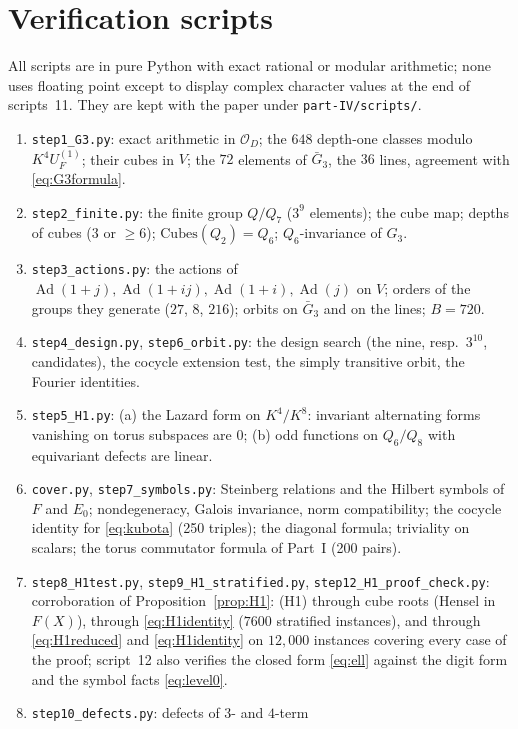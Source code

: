 \documentclass[11pt]{article}
\newcommand{\Ad}{\operatorname{Ad}}
\newcommand{\Ocal}{\mathcal O}
\newcommand{\Cubes}{\mathrm{Cubes}}
\theoremstyle{plain}
\theoremstyle{definition}
\begin{document}
\section{Verification scripts}\label{app:scripts}
All scripts are in pure Python with exact rational or modular
arithmetic; none uses floating point except to display complex
character values at the end of scripts~11.  They are kept with the
paper under \texttt{part-IV/scripts/}.
\begin{enumerate}[label=\arabic*.]
\item \texttt{step1\_G3.py}: exact arithmetic in $\Ocal_D$; the $648$
depth-one classes modulo $K^4U_F^{(1)}$; their cubes in $V$; the $72$
elements of $\bar G_3$, the $36$ lines, agreement with \eqref{eq:G3formula}.
\item \texttt{step2\_finite.py}: the finite group $Q/Q_7$ ($3^9$
elements); the cube map; depths of cubes ($3$ or $\ge6$);
$\Cubes(Q_2)=Q_6$; $Q_6$-invariance of $G_3$.
\item \texttt{step3\_actions.py}: the actions of $\Ad(1+j),\Ad(1+ij),\Ad(1+i),\Ad(j)$
on $V$; orders of the groups they generate ($27$, $8$, $216$); orbits on
$\bar G_3$ and on the lines; $B=720$.
\item \texttt{step4\_design.py}, \texttt{step6\_orbit.py}: the design
search (the nine, resp.\ $3^{10}$, candidates), the cocycle extension
test, the simply transitive orbit, the Fourier identities.
\item \texttt{step5\_H1.py}: (a) the Lazard form on $K^4/K^8$:
invariant alternating forms vanishing on torus subspaces are $0$;
(b) odd functions on $Q_6/Q_8$ with equivariant defects are linear.
\item \texttt{cover.py}, \texttt{step7\_symbols.py}: Steinberg
relations and the Hilbert symbols of $F$ and $E_0$; nondegeneracy,
Galois invariance, norm compatibility; the cocycle identity for
\eqref{eq:kubota} (250 triples); the diagonal formula; triviality on
scalars; the torus commutator formula of Part~I (200 pairs).
\item \texttt{step8\_H1test.py}, \texttt{step9\_H1\_stratified.py},
\texttt{step12\_H1\_proof\_check.py}: corroboration of
Proposition~\ref{prop:H1}: (H1) through cube roots (Hensel in $F(X)$),
through \eqref{eq:H1identity} ($7600$ stratified instances), and
through \eqref{eq:H1reduced} and \eqref{eq:H1identity} on $12{,}000$
instances covering every case of the proof; script~12 also verifies the
closed form \eqref{eq:ell} against the digit form and the symbol facts
\eqref{eq:level0}.
\item \texttt{step10\_defects.py}: defects of $3$- and $4$-term

\end{enumerate}
\end{document}
